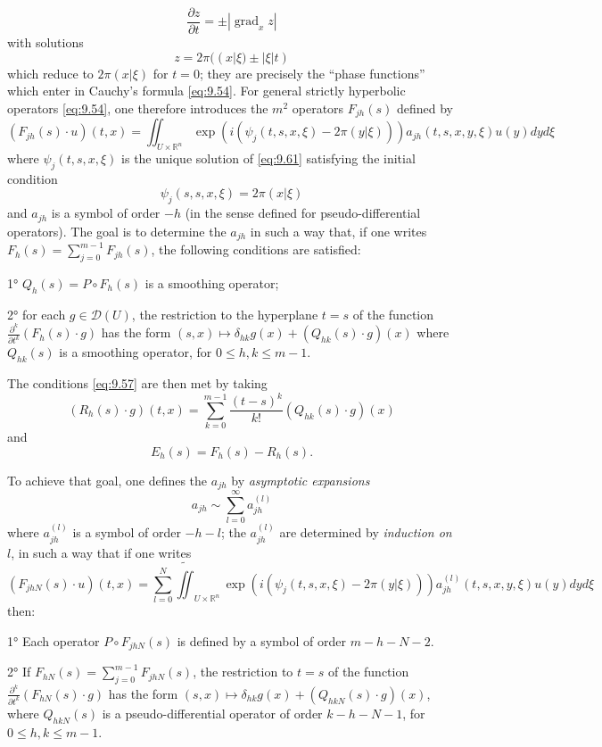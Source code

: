 \documentclass[12pt,a4paper,leqno,twoside]{extbook}
\newcommand{\R}{\mathbb{R}}
\newcommand{\grad}{\operatorname{grad}}
\newcommand{\pder}[2]{\frac{\partial #1}{\partial #2}}
\begin{document}
\[
    \pder{z}{t} = \pm |\grad_x{z}|
\]
with solutions
\[
    z = 2\pi ((x | \xi) \pm |\xi|t)
\]
which reduce to \(2\pi(x|\xi)\) for \(t = 0\); they are precisely the ``phase functions'' which enter in Cauchy's formula \eqref{eq:9.54}. For general strictly hyperbolic operators \eqref{eq:9.54}, one therefore introduces the \(m^2\) operators \(F_{jh}(s)\) defined by
\begin{equation}
    \label{eq:9.62}
    (F_{jh}(s) \cdot u)(t,x) =
    \iint_{U \times \R^n} \exp\left( i(\psi_j(t,s,x,\xi) - 2\pi(y|\xi)) \right) a_{jh}(t,s,x,y,\xi) u(y) dy d\xi
\end{equation}
where \(\psi_j(t,s,x,\xi)\) is the unique solution of \eqref{eq:9.61} satisfying the initial condition
\begin{equation}
    \label{eq:9.63}
    \psi_j(s,s,x,\xi) = 2\pi(x | \xi)
\end{equation}
and \(a_{jh}\) is a symbol of order \(-h\) (in the sense defined for pseudo-differential operators). The goal is to determine the \(a_{jh}\) in such a way that, if one writes \(F_h(s) = \sum\limits_{j=0}^{m-1} F_{jh}(s)\), the following conditions are satisfied:

1° \(Q_h(s) = P \circ F_h(s)\) is a smoothing operator;

2° for each \(g \in \mathcal{D}(U)\), the restriction to the hyperplane \(t=s\) of the function \(\pder{^k}{t^k} \left(F_h(s) \cdot g\right)\) has the form \((s,x) \mapsto \delta_{hk} g(x) + \left(Q_{hk}(s) \cdot g\right)(x)\) where \(Q_{hk}(s)\) is a smoothing operator, for \(0 \leq h, k \leq m-1\).

The conditions \eqref{eq:9.57} are then met by taking
\[
    (R_h(s) \cdot g)(t,x) = \sum_{k=0}^{m-1} \frac{(t-s)^k}{k!} (Q_{hk}(s) \cdot g)(x)
\]
and
\[
    E_h(s) = F_h(s) - R_h(s).
\]

To achieve that goal, one defines the \(a_{jh}\) by \emph{asymptotic expansions}
\[
    a_{jh} \sim{} \sum_{l=0}^\infty a^{(l)}_{jh}
\]
where \(a^{(l)}_{jh}\) is a symbol of order \(-h-l\); the \(a^{(l)}_{jh}\) are determined by \emph{induction on} \(l\), in such a way that if one writes
\[
    (F_{jhN}(s) \cdot u)(t,x) =
    \sum_{l=0}^N \widetilde{\iint}_{U \times \R^n} \exp(i(\psi_j(t,s,x,\xi) - 2\pi(y|\xi))) a^{(l)}_{jh}(t,s,x,y,\xi) u(y) dy d\xi
\]
then:

1° Each operator \(P \circ F_{jhN}(s)\) is defined by a symbol of order \(m-h-N-2\).

2° If \(F_{hN}(s) = \sum\limits_{j=0}^{m-1} F_{jhN}(s)\), the restriction to \(t=s\) of the function \(\pder{^k}{t^k}(F_{hN}(s) \cdot g)\) has the form \((s, x) \mapsto \delta_{hk} g(x) + (Q_{hkN}(s) \cdot g)(x)\), where \(Q_{hkN}(s)\) is a pseudo-differential operator of order \(k-h-N-1\), for \(0 \leq h,k \leq m-1\).
\end{document}
